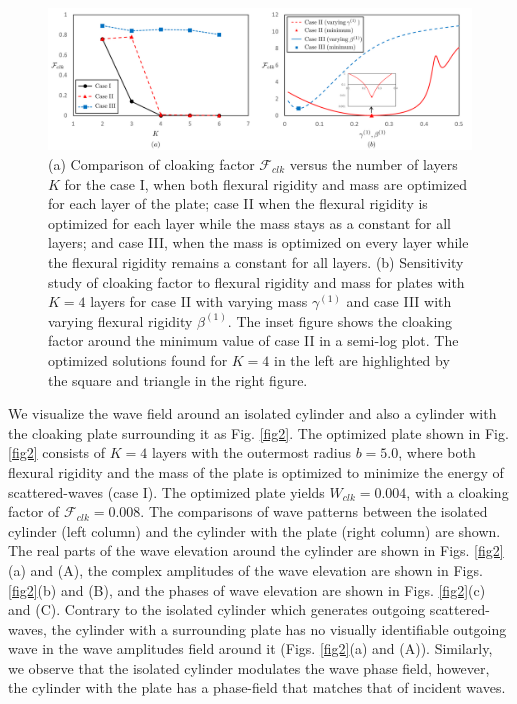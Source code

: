 \documentclass{jfm}
\begin{document}
\begin{figure}
 \centering
 \includegraphics[width=5.4in]{fig/fig3.png}
 \caption{(a) Comparison of cloaking factor $\mathcal{F}_{clk}$ versus the number of layers $K$ for the case I, when both flexural rigidity and mass are optimized for each layer of the plate;
case II when the flexural rigidity is optimized for each layer while the mass stays as a constant for all layers; and 
case III, when the mass is optimized on every layer while the flexural rigidity remains a constant for all layers.
(b) Sensitivity study of cloaking factor to flexural rigidity and mass for plates with $K=4$ layers for case II with varying mass $\gamma^{(1)}$ and case III with varying flexural rigidity $\beta^{(1)}$. The inset figure shows the cloaking factor around the minimum value of case II in a semi-log plot. The optimized solutions found for $K=4$ in the left are highlighted by the square and triangle in the right figure.
}
\label{fig3}
\end{figure}
We visualize the wave field around an isolated cylinder and also a cylinder with the cloaking plate surrounding it as Fig. \ref{fig2}. The optimized plate shown in Fig. \ref{fig2} consists of $K=4$ layers with the outermost radius $b=5.0$, where both flexural rigidity and the mass of the plate is optimized to minimize the energy of scattered-waves (case I). The optimized plate yields $W_{clk}=0.004$, with a cloaking factor of $\mathcal{F}_{clk}=0.008$. The comparisons of wave patterns between the isolated cylinder (left column) and the cylinder with the plate (right column) are shown.  The real parts of the wave elevation around the cylinder are shown in Figs. \ref{fig2}(a) and (A), the complex amplitudes of the wave elevation are shown in Figs. \ref{fig2}(b) and (B), and the phases of wave elevation are shown in Figs. \ref{fig2}(c) and (C). Contrary to the isolated cylinder which generates outgoing scattered-waves, the cylinder with a surrounding plate has no visually identifiable outgoing wave in the wave amplitudes field around it (Figs. \ref{fig2}(a) and (A)). Similarly, we observe that the isolated cylinder modulates the wave phase field, however, the cylinder with the plate has a phase-field that matches that of incident waves.
\end{document}
